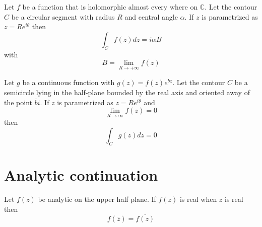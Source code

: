         \begin{theorem}\label{complexcalculus:theorem:great_limit}
		Let $f$ be a function that is holomorphic almost every where on $\mathbb{C}$. Let the contour $C$ be a circular segment with radius $R$ and central angle $\alpha$. If $z$ is parametrized as $z = Re^{i\theta}$ then\[\int_Cf(z)dz = i\alpha B\] with \[B = \lim_{R\rightarrow+\infty}f(z)\]
	\end{theorem}
	
        \begin{theorem}\label{complexcalculus:theorem:jordan}
		Let $g$ be a continuous function with $g(z) = f(z)e^{bz}$. Let the contour $C$ be a semicircle lying in the half-plane bounded by the real axis and oriented away of the point $\overline{b}i$. If $z$ is parametrized as $z=Re^{i\theta}$ and \[\lim_{R\rightarrow\infty}f(z) = 0\] then\[\int_Cg(z)dz = 0\]
	\end{theorem}
		
\section{Analytic continuation}

	\begin{theorem}
		Let $f(z)$ be analytic on the upper half plane. If $f(z)$ is real when $z$ is real then
	        \begin{equation}
	        	f(\overline{z}) = \overline{f(z)}
	        \end{equation}
	\end{theorem}
